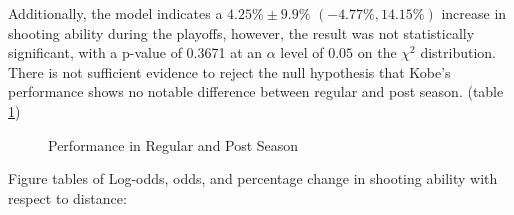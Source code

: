 \indent Additionally, the model indicates a $ 4.25\% \pm 9.9\% \,\,(-4.77\%, 14.15\%) $ increase in shooting ability during the playoffs, however, the result was not statistically significant, with a
p-value of 0.3671 at an $\alpha$ level of $0.05$ on the $\chi^2$ distribution.  There is not sufficient evidence to reject the null hypothesis that Kobe's performance shows no notable difference between regular and post season. (table \ref{fig:post-season})

    \begin{figure}
    \caption{\label{fig:post-season} Performance in Regular and Post Season}
\end{figure}
\vskip 1cm

Figure tables of Log-odds, odds, and percentage change in shooting ability with respect to distance:


